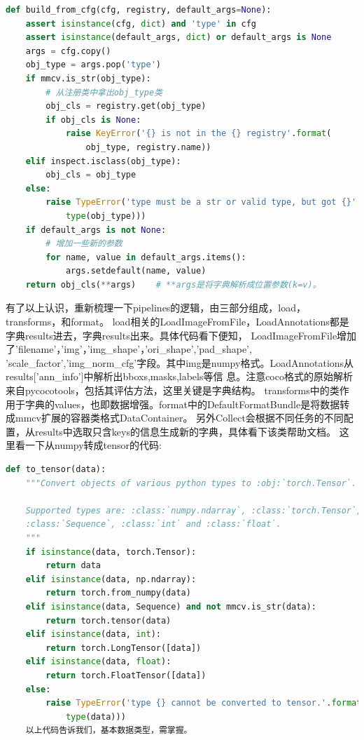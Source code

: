 \documentclass[UTF8]{ctexart}
\begin{document}
\lstset{style=mystyle}
\begin{lstlisting}[language=Python]
def build_from_cfg(cfg, registry, default_args=None):
	assert isinstance(cfg, dict) and 'type' in cfg
	assert isinstance(default_args, dict) or default_args is None
	args = cfg.copy()
	obj_type = args.pop('type')
	if mmcv.is_str(obj_type):
		# 从注册类中拿出obj_type类
		obj_cls = registry.get(obj_type)
		if obj_cls is None:
			raise KeyError('{} is not in the {} registry'.format(
				obj_type, registry.name))
	elif inspect.isclass(obj_type):
		obj_cls = obj_type
	else:
		raise TypeError('type must be a str or valid type, but got {}'.format(
			type(obj_type)))
	if default_args is not None:
		# 增加一些新的参数
		for name, value in default_args.items():
			args.setdefault(name, value)
	return obj_cls(**args)    # **args是将字典解析成位置参数(k=v)。
\end{lstlisting}

有了以上认识，重新梳理一下pipelines的逻辑，由三部分组成，load，transforms，和format。
load相关的LoadImageFromFile，LoadAnnotations都是字典results进去，字典results出来。具体代码看下便知，
LoadImageFromFile增加了'filename'，'img'，'img\_shape'，'ori\_shape','pad\_shape',
'scale\_factor','img\_norm\_cfg'字段。其中img是numpy格式。LoadAnnotations从results['ann\_info']中解析出bboxs,masks,labels等信
息。注意coco格式的原始解析来自pycocotools，包括其评估方法，这里关键是字典结构。
transforms中的类作用于字典的values，也即数据增强。format中的DefaultFormatBundle是将数据转成mmcv扩展的容器类格式DataContainer。
另外Collect会根据不同任务的不同配置，从results中选取只含keys的信息生成新的字典，具体看下该类帮助文档。
这里看一下从numpy转成tensor的代码:

\lstset{style=mystyle}
\begin{lstlisting}[language=Python]
def to_tensor(data):
    """Convert objects of various python types to :obj:`torch.Tensor`.

    Supported types are: :class:`numpy.ndarray`, :class:`torch.Tensor`,
    :class:`Sequence`, :class:`int` and :class:`float`.
    """
    if isinstance(data, torch.Tensor):
        return data
    elif isinstance(data, np.ndarray):
        return torch.from_numpy(data)
    elif isinstance(data, Sequence) and not mmcv.is_str(data):
        return torch.tensor(data)
    elif isinstance(data, int):
        return torch.LongTensor([data])
    elif isinstance(data, float):
        return torch.FloatTensor([data])
    else:
        raise TypeError('type {} cannot be converted to tensor.'.format(
			type(data)))
	以上代码告诉我们，基本数据类型，需掌握。
\end{lstlisting}
\end{document}

